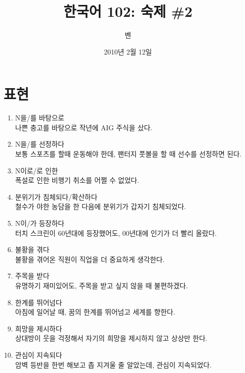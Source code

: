 \documentclass{article}
\title{한국어 102: 숙제 \#2}
\author{벤}
\date{2010년 2월 12일}
\begin{document}
\maketitle
\thispagestyle{empty}
\pagestyle{empty}

\section{표현}
\begin{enumerate}
  \item N을/를 바탕으로 \\
나쁜 충고를 바탕으로 작년에 AIG 주식을 샀다.

  \item N을/를 선정하다 \\
보통 스포츠를 할때 운동해야 한데, 팬터지 풋볼을 할 때 선수를 선정하면 된다.

  \item N이로/로 인한 \\
폭설로 인한 비행기 취소를 어쩔 수 없었다.

  \item 분위기가 침체되다/확산하다 \\
철수가 야한 농담을 한 다음에 분위기가 갑자기 침체되었다.

  \item N이/가 등장하다 \\
터치 스크린이 60년대에 등장했어도, 00년대에 인기가 더 빨리 올랐다.

  \item 불황을 겪다 \\
불황을 겪어온 직원이 직업을 더 중요하게 생각한다.

  \item 주목을 받다 \\
유명하기 재미있어도, 주목을 받고 싶지 않을 때 불편하겠다.

  \item 한계를 뛰어넘다 \\
아침에 일어날 때, 꿈의 한계를 뛰어넘고 세계를 향한다.

  \item 희망을 제시하다 \\
상대방이 웃을 걱정해서 자기의 희망을 제시하지 않고 상상만 한다.

  \item 관심이 지속되다 \\
암벽 등반을 한번 해보고 좁 지겨울 줄 알았는데, 관심이 지속되었다.

\end{enumerate}
\end{document}
